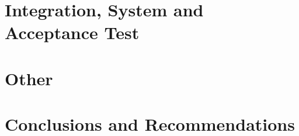 \documentclass[a4paper,12pt]{article}
\begin{document}
	\section{Integration, System and Acceptance Test}	 
		
	
	\section{Other}	 
		
		
		
	\section{Conclusions and Recommendations}	 
		
	


		
	
	
\end{document}
